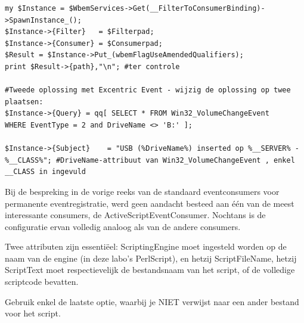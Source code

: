 \documentclass[11pt,a4paper]{report}
\begin{document}
\begin{enumerate}[resume]
\begin{lstlisting}
my $Instance = $WbemServices->Get(__FilterToConsumerBinding)->SpawnInstance_();
$Instance->{Filter}   = $Filterpad;
$Instance->{Consumer} = $Consumerpad;
$Result = $Instance->Put_(wbemFlagUseAmendedQualifiers);
print $Result->{path},"\n"; #ter controle

#Tweede oplossing met Excentric Event - wijzig de oplossing op twee plaatsen:
$Instance->{Query} = qq[ SELECT * FROM Win32_VolumeChangeEvent
WHERE EventType = 2 and DriveName <> 'B:' ];

$Instance->{Subject}    = "USB (%DriveName%) inserted op %__SERVER% - %__CLASS%"; #DriveName-attribuut van Win32_VolumeChangeEvent , enkel __CLASS in ingevuld
	\end{lstlisting}
\end{enumerate}
Bij de bespreking in de vorige reeks van de standaard eventconsumers voor permanente eventregistratie, werd geen aandacht besteed aan één van de meest interessante consumers, de ActiveScriptEventConsumer. Nochtans is de configuratie ervan volledig analoog als van de andere consumers. \par Twee attributen zijn essentiëel: ScriptingEngine moet ingesteld worden op de naam van de engine (in deze labo's PerlScript), en hetzij ScriptFileName, hetzij ScriptText moet respectievelijk de bestandsnaam van het script, of de volledige scriptcode bevatten.
\par Gebruik enkel de laatste optie, waarbij je NIET verwijst naar een ander bestand voor het script.
\end{document}
